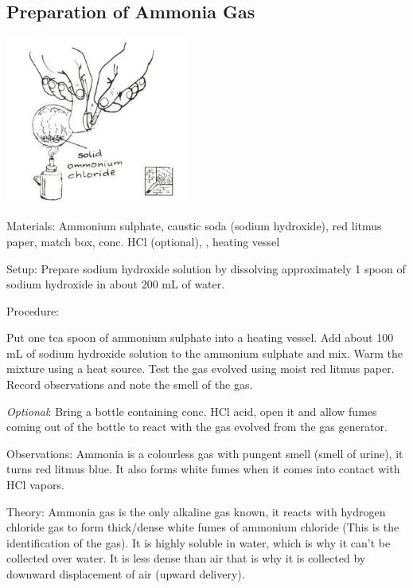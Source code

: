 \begin{multicols}{2}
\subsection{Preparation of Ammonia Gas} %

\begin{center}
\includegraphics[width=0.45\textwidth]{./img/source/ammonia.jpg}
\end{center}

\begin{description*}
\item[Materials:]{Ammonium sulphate, caustic soda (sodium hydroxide),
red litmus paper, match box, conc. HCl (optional), , heating
vessel}
\item[Setup:]{Prepare sodium hydroxide solution by dissolving approximately 1 spoon of
sodium hydroxide in about 200 mL of water.}
\item[Procedure:]{Put one tea spoon of ammonium sulphate into a heating vessel. Add about 100 mL of sodium hydroxide solution to the ammonium
sulphate and mix. Warm the mixture using a heat source. Test the gas evolved using moist red litmus paper. Record observations and note the smell of the gas.

\emph{Optional}: Bring a bottle containing conc. HCl acid, open it and allow
fumes coming out of the bottle to react with the gas evolved from the
gas generator.}
\item[Observations:]{Ammonia is a colourless gas with pungent smell (smell of urine), it turns red
litmus blue. It also forms white fumes when it comes into contact with HCl
vapors.}
\item[Theory:]{Ammonia gas is the only alkaline gas known, it reacts with hydrogen
chloride gas to form thick/dense white fumes of ammonium chloride (This
is the identification of the gas). It is highly soluble in water, which is why
it can't be collected over water. It is less dense than air that is why it is
collected by downward displacement of air (upward delivery).}
\end{description*}


\end{multicols}
